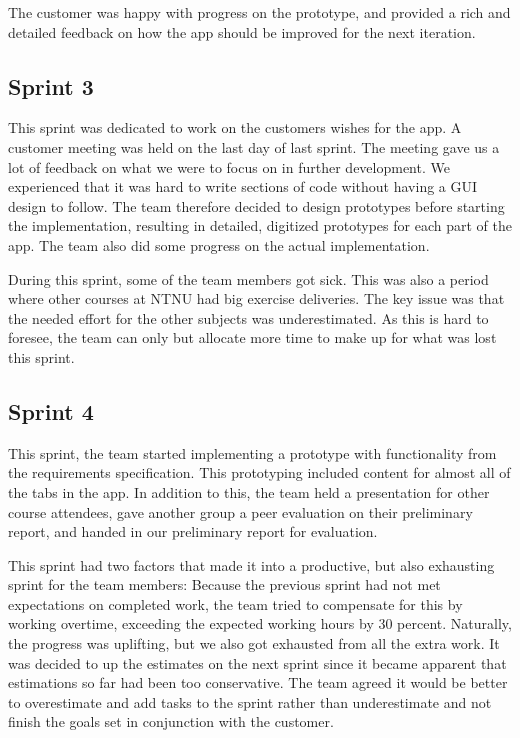 The customer was happy with progress on the prototype, and provided a rich and detailed feedback on how the app should be improved for the next iteration.

\subsection{Sprint 3}
This sprint was dedicated to work on the customers wishes for the app. A customer meeting was held on the last day of last sprint. The meeting gave us a lot of feedback on what we were to focus on in further development. We experienced that it was hard to write sections of code without having a GUI design to follow. The team therefore decided to design prototypes before starting the implementation, resulting in detailed, digitized prototypes for each part of the app. The team also did some progress on the actual implementation.

During this sprint, some of  the team members got sick. This was also a period where other courses at NTNU had big exercise deliveries. The key issue was that the needed effort for the other subjects was underestimated. As this is hard to foresee, the team can only but allocate more time to make up for what was lost this sprint.

\subsection{Sprint 4}
This sprint, the team started implementing a prototype with functionality from the requirements specification. This prototyping included content for almost all of the tabs in the app. In addition to this, the team held a presentation for other course attendees, gave another group a peer evaluation on their preliminary report, and handed in our preliminary report for evaluation.

This sprint had two factors that made it into a productive, but also exhausting sprint for the team members: Because the previous sprint had not met expectations on completed work, the team tried to compensate for this by working overtime, exceeding the expected working hours by 30 percent. Naturally, the progress was uplifting, but we also got exhausted from all the extra work. It was decided to up the estimates on the next sprint since it became apparent that estimations so far had been too conservative. The team agreed it would be better to overestimate and add tasks to the sprint rather than underestimate and not finish the goals set in conjunction with the customer.

